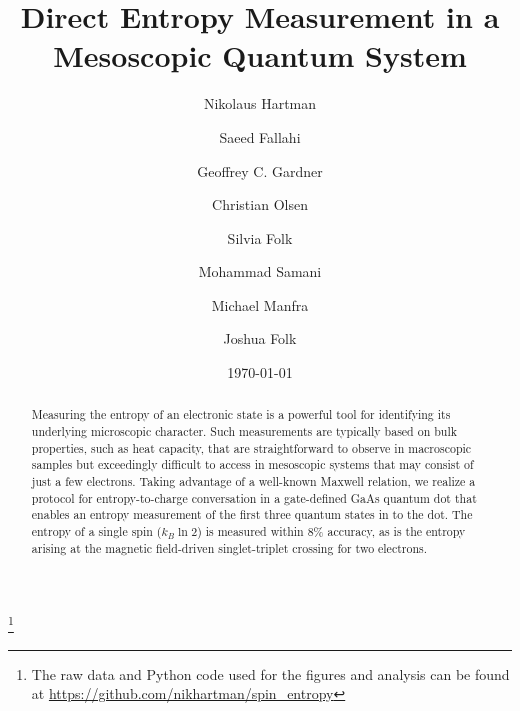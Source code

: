 \documentclass[preprint,showpacs,preprintnumbers,amsmath,amssymb,pra,aps,superscriptaddress]{revtex4-1}
\begin{document}
\title{Direct Entropy Measurement in a Mesoscopic Quantum System}
\author{Nikolaus Hartman}
\thanks{The raw data and Python code used for the figures and analysis can be found at \url{https://github.com/nikhartman/spin_entropy}}
\author{Saeed Fallahi}
\author{Geoffrey C. Gardner}
\author{Christian Olsen}
\author{Silvia Folk}
\author{Mohammad Samani}
\author{Michael Manfra}
\author{Joshua Folk}
\date{\today}

\begin{abstract}

Measuring the entropy of an electronic state is a powerful tool for identifying its underlying microscopic character.  Such measurements are typically based on bulk properties, such as heat capacity, that are straightforward to observe in macroscopic samples but exceedingly difficult to access in mesoscopic systems that may consist of just a few electrons. Taking advantage of a well-known Maxwell relation, we realize a protocol for entropy-to-charge conversation in a gate-defined GaAs quantum dot that enables an entropy measurement of the first three quantum states in to the dot. The entropy of a single spin ($k_B \ln{2}$) is measured within 8\% accuracy, as is the entropy arising at the magnetic field-driven singlet-triplet crossing for two electrons.

\end{abstract}

\maketitle
\end{document}
